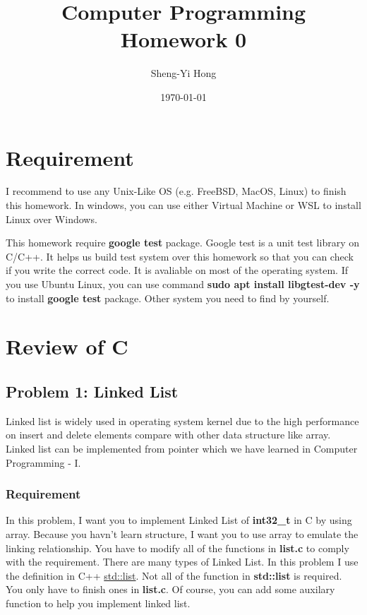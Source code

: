 \documentclass{report}
\title{Computer Programming Homework 0}
\author{Sheng-Yi Hong}
\date{\today}
\begin{document}
\maketitle

\tableofcontents

\chapter{Requirement}

I recommend to use any Unix-Like OS (e.g. FreeBSD, MacOS, Linux) to finish this
homework. In windows, you can use either Virtual Machine or WSL to install Linux over Windows.

This homework require \textbf{google test} package. Google test is a unit test
library on C/C++. It helps us build test system over this homework so that you can check
if you write the correct code. It is avaliable on most of the operating system.
If you use Ubuntu Linux, you can use command \textbf{sudo apt install
  libgtest-dev -y} to install \textbf{google test} package. Other system you need to find by yourself.

\chapter{Review of C}

\section{Problem 1: Linked List}

Linked list is widely used in operating system kernel due to the high
performance on insert and delete elements compare with other data structure like
array. Linked list can be implemented from pointer which we have learned in
Computer Programming - I.

\subsection{Requirement}

In this problem, I want you to implement Linked List of \textbf{int32\_t} in C by
using array. Because you havn't learn structure, I want you to use array to
emulate the linking relationship. You have to modify all of the functions in \textbf{list.c} to
comply with the requirement. There are many types of Linked List. In this
problem I use the definition in C++
\href{https://en.cppreference.com/w/cpp/container/list}{std::list}. Not all of
the function in \textbf{std::list} is required. You only have to finish ones in
\textbf{list.c}. Of course, you can add some auxilary function to help you
implement linked list.
\end{document}
